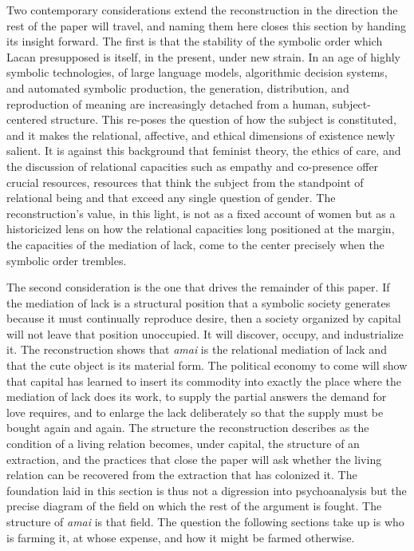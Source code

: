 Two contemporary considerations extend the reconstruction in the direction the rest of the paper will travel, and naming them here closes this section by handing its insight forward. The first is that the stability of the symbolic order which Lacan presupposed is itself, in the present, under new strain. In an age of highly symbolic technologies, of large language models, algorithmic decision systems, and automated symbolic production, the generation, distribution, and reproduction of meaning are increasingly detached from a human, subject-centered structure. This re-poses the question of how the subject is constituted, and it makes the relational, affective, and ethical dimensions of existence newly salient. It is against this background that feminist theory, the ethics of care, and the discussion of relational capacities such as empathy and co-presence offer crucial resources, resources that think the subject from the standpoint of relational being and that exceed any single question of gender. The reconstruction's value, in this light, is not as a fixed account of women but as a historicized lens on how the relational capacities long positioned at the margin, the capacities of the mediation of lack, come to the center precisely when the symbolic order trembles.

The second consideration is the one that drives the remainder of this paper. If the mediation of lack is a structural position that a symbolic society generates because it must continually reproduce desire, then a society organized by capital will not leave that position unoccupied. It will discover, occupy, and industrialize it. The reconstruction shows that \textit{amai} is the relational mediation of lack and that the cute object is its material form. The political economy to come will show that capital has learned to insert its commodity into exactly the place where the mediation of lack does its work, to supply the partial answers the demand for love requires, and to enlarge the lack deliberately so that the supply must be bought again and again. The structure the reconstruction describes as the condition of a living relation becomes, under capital, the structure of an extraction, and the practices that close the paper will ask whether the living relation can be recovered from the extraction that has colonized it. The foundation laid in this section is thus not a digression into psychoanalysis but the precise diagram of the field on which the rest of the argument is fought. The structure of \textit{amai} is that field. The question the following sections take up is who is farming it, at whose expense, and how it might be farmed otherwise.


